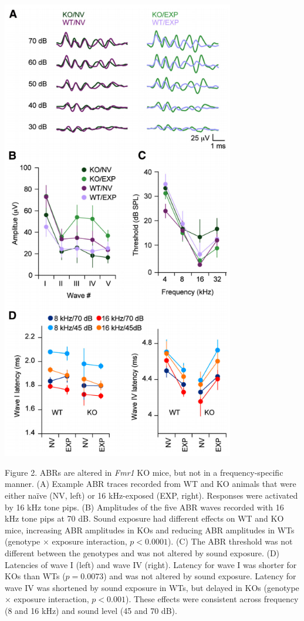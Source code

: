 \centerline{\includegraphics[width=4in]{images/C2F2}}

\begin{changemargin}{1in}{1in}
\footnotesize{Figure 2. ABRs are altered in \textit{Fmr1} KO mice, but not in a frequency-specific manner. (A) Example ABR traces recorded from WT and KO animals that were either na\"ive (NV, left) or 16 kHz-exposed (EXP, right). Responses were activated by 16 kHz tone pips. (B) Amplitudes of the five ABR waves recorded with 16 kHz tone pips at 70 dB. Sound exposure had different effects on WT and KO mice, increasing ABR amplitudes in KOs and reducing ABR amplitudes in WTs (genotype $\times$ exposure interaction, $p<0.0001$). (C) The ABR threshold was not different between the genotypes and was not altered by sound exposure. (D) Latencies of wave I (left) and wave IV (right). Latency for wave I was shorter for KOs than WTs ($p=0.0073$) and was not altered by sound exposure. Latency for wave IV was shortened by sound exposure in WTs, but delayed in KOs (genotype $\times$ exposure interaction, $p<0.001$). These effects were consistent across frequency (8 and 16 kHz) and sound level (45 and 70 dB).}
\end{changemargin}

